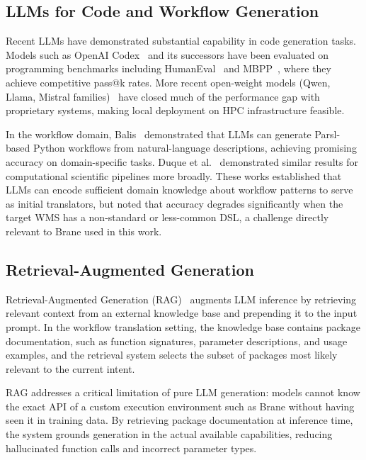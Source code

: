 \subsection{LLMs for Code and Workflow Generation}

Recent LLMs have demonstrated substantial capability in code generation tasks. Models
such as OpenAI Codex~\cite{chen2021evaluating} and its successors have been
evaluated on programming benchmarks including HumanEval~\cite{chen2021evaluating} and MBPP~\cite{austin2021mbpp}, where they
achieve competitive pass@k rates. More recent open-weight models (Qwen, Llama,
Mistral families)~\cite{qwen2025,dubey2024llama3,jiang2023mistral} have closed much of the performance gap with proprietary
systems, making local deployment on HPC infrastructure feasible.

In the workflow domain, Balis~\cite{balis2024llm} demonstrated that LLMs can
generate Parsl-based Python workflows from natural-language descriptions,
achieving promising accuracy on domain-specific tasks. Duque et al.~\cite{duque2023llmworkflows}
demonstrated similar results for computational scientific pipelines more broadly. These works
established that LLMs can encode sufficient domain knowledge about workflow
patterns to serve as initial translators, but noted that accuracy degrades
significantly when the target WMS has a non-standard or less-common DSL, a
challenge directly relevant to Brane used in this work.

\subsection{Retrieval-Augmented Generation}

Retrieval-Augmented Generation (RAG)~\cite{lewis2020rag} augments LLM inference
by retrieving relevant context from an external knowledge base and prepending it
to the input prompt. In the workflow translation setting, the knowledge base
contains package documentation, such as function signatures, parameter descriptions, and
usage examples, and the retrieval system selects the subset of packages most
likely relevant to the current intent.

RAG addresses a critical limitation of pure LLM generation: models cannot know
the exact API of a custom execution environment such as Brane without having
seen it in training data. By retrieving package documentation at inference time,
the system grounds generation in the actual available capabilities, reducing
hallucinated function calls and incorrect parameter types.


